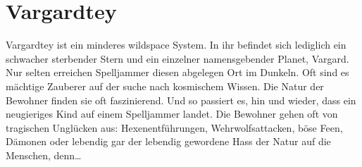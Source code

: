 \documentclass{book}
\begin{document}
    \section{Vargardtey}

    Vargardtey ist ein minderes wildspace System. In ihr befindet sich lediglich ein schwacher sterbender Stern und ein einzelner namensgebender Planet, Vargard. Nur selten erreichen Spelljammer diesen abgelegen Ort im Dunkeln. Oft sind es mächtige Zauberer auf der suche nach kosmischem Wissen. Die Natur der Bewohner finden sie oft faszinierend. Und so passiert es, hin und wieder, dass ein neugieriges Kind auf einem Spelljammer landet. Die Bewohner gehen oft von tragischen Unglücken aus: Hexenentführungen, Wehrwolfsattacken, böse Feen, Dämonen oder lebendig gar der lebendig gewordene Hass der Natur auf die Menschen, denn\dots\\
\end{document}
